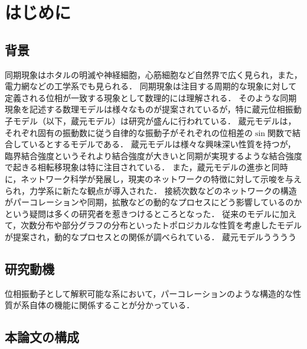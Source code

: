 \documentclass[../main]{subfiles}
\begin{document}
\chapter{はじめに}
\section{背景}
\label{chap:intro-back}
同期現象はホタルの明滅や神経細胞，心筋細胞など自然界で広く見られ，また，電力網などの工学系でも見られる．
同期現象は注目する周期的な現象に対して定義される位相が一致する現象として数理的には理解される．
そのような同期現象を記述する数理モデルは様々なものが提案されているが，特に蔵元位相振動子モデル（以下，蔵元モデル）は研究が盛んに行われている．
蔵元モデルは，それぞれ固有の振動数に従う自律的な振動子がそれぞれの位相差の$\sin$関数で結合しているとするモデルである．
蔵元モデルは様々な興味深い性質を持つが，臨界結合強度というそれより結合強度が大きいと同期が実現するような結合強度で起きる相転移現象は特に注目されている．
また，蔵元モデルの進歩と同時に，ネットワーク科学が発展し，現実のネットワークの特徴に対して示唆を与えられ，力学系に新たな観点が導入された．
接続次数などのネットワークの構造がパーコレーションや同期，拡散などの動的なプロセスにどう影響しているのかという疑問は多くの研究者を惹きつけるところとなった．
従来のモデルに加えて，次数分布や部分グラフの分布といったトポロジカルな性質を考慮したモデルが提案され，動的なプロセスとの関係が調べられている．
蔵元モデルうううう\cite{RODRIGUES20161}
\section{研究動機}
\label{chap:intro-motiv}
位相振動子として解釈可能な系において，パーコレーションのような構造的な性質が系自体の機能に関係することが分かっている．

\section{本論文の構成}
\label{chap:intro-config}
\end{document}
